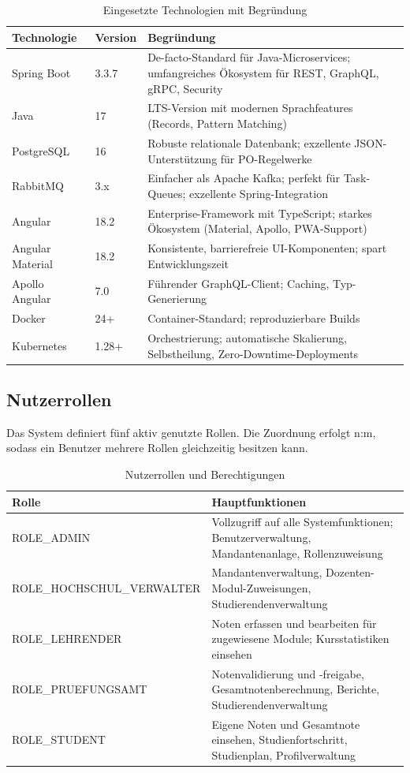 \documentclass[12pt,a4paper,ngerman]{article}
\begin{document}
\begin{table}[H]
\centering
\caption{Eingesetzte Technologien mit Begründung}
\begin{tabular}{llL{6cm}}
\toprule
\textbf{Technologie} & \textbf{Version} & \textbf{Begründung} \\
\midrule
Spring Boot       & 3.3.7  & De-facto-Standard für Java-Microservices; umfangreiches Ökosystem für REST, GraphQL, gRPC, Security \\
Java              & 17     & LTS-Version mit modernen Sprachfeatures (Records, Pattern Matching) \\
PostgreSQL        & 16     & Robuste relationale Datenbank; exzellente JSON-Unterstützung für PO-Regelwerke \\
RabbitMQ          & 3.x    & Einfacher als Apache Kafka; perfekt für Task-Queues; exzellente Spring-Integration \\
Angular           & 18.2   & Enterprise-Framework mit TypeScript; starkes Ökosystem (Material, Apollo, PWA-Support) \\
Angular Material  & 18.2   & Konsistente, barrierefreie UI-Komponenten; spart Entwicklungszeit \\
Apollo Angular    & 7.0    & Führender GraphQL-Client; Caching, Typ-Generierung \\
Docker            & 24+    & Container-Standard; reproduzierbare Builds \\
Kubernetes        & 1.28+  & Orchestrierung; automatische Skalierung, Selbstheilung, Zero-Downtime-Deployments \\
\bottomrule
\end{tabular}
\end{table}

\subsection{Nutzerrollen}

Das System definiert fünf aktiv genutzte Rollen. Die Zuordnung erfolgt n:m, sodass ein Benutzer mehrere Rollen gleichzeitig besitzen kann.

\begin{table}[H]
\centering
\caption{Nutzerrollen und Berechtigungen}
\begin{tabular}{lL{10cm}}
\toprule
\textbf{Rolle} & \textbf{Hauptfunktionen} \\
\midrule
ROLE\_ADMIN               & Vollzugriff auf alle Systemfunktionen; Benutzerverwaltung, Mandantenanlage, Rollenzuweisung \\
ROLE\_HOCHSCHUL\_VERWALTER & Mandantenverwaltung, Dozenten-Modul-Zuweisungen, Studierendenverwaltung \\
ROLE\_LEHRENDER            & Noten erfassen und bearbeiten für zugewiesene Module; Kursstatistiken einsehen \\
ROLE\_PRUEFUNGSAMT         & Notenvalidierung und -freigabe, Gesamtnotenberechnung, Berichte, Studierendenverwaltung \\
ROLE\_STUDENT              & Eigene Noten und Gesamtnote einsehen, Studienfortschritt, Studienplan, Profilverwaltung \\
\bottomrule
\end{tabular}
\end{table}
\end{document}
